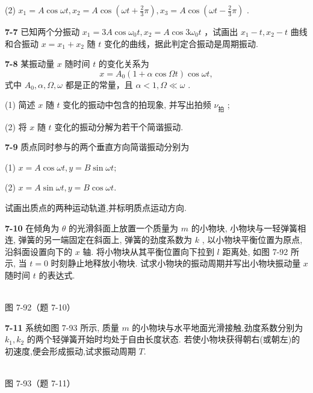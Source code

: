 (2) $x_{1} = A\cos \omega t, x_{2} = A\cos \left(\omega t + \frac{2}{3}\pi\right), x_{3} = A\cos \left(\omega t - \frac{2}{3}\pi\right)$ .

\newpage

\textbf{7-7} 已知两个分振动 $x_{1} = 3A\cos \omega_{0}t, x_{2} = A\cos 3\omega_{0}t$ ，试画出 $x_{1} - t, x_{2} - t$ 曲线和合振动 $x = x_{1} + x_{2}$ 随 $t$ 变化的曲线，据此判定合振动是周期振动.

\newpage

\textbf{7-8} 某振动量 $x$ 随时间 $t$ 的变化关系为
\[
x = A _ {0} (1 + \alpha \cos \Omega t) \cos \omega t,
\]
式中 $A_0, \alpha, \Omega, \omega$ 都是正的常量，且 $\alpha < 1, \Omega \ll \omega$ .

(1) 简述 $x$ 随 $t$ 变化的振动中包含的拍现象, 并写出拍频 $\nu_{\text{拍}}$ ;

(2) 将 $x$ 随 $t$ 变化的振动分解为若干个简谐振动.

\newpage

\textbf{7-9} 质点同时参与的两个垂直方向简谐振动分别为

(1) $x = A\cos \omega t, y = B\sin \omega t;$

(2) $x = A\sin \omega t, y = B\cos \omega t.$

试画出质点的两种运动轨道,并标明质点运动方向.

\newpage

\textbf{7-10} 在倾角为 $\theta$ 的光滑斜面上放置一个质量为 $m$ 的小物块, 小物块与一轻弹簧相连, 弹簧的另一端固定在斜面上, 弹簧的劲度系数为 $k$ , 以小物块平衡位置为原点, 沿斜面设置向下的 $x$ 轴. 将小物块从其平衡位置向下拉到 $l$ 距离处, 如图 7-92 所示, 当 $t=0$ 时刻静止地释放小物块. 试求小物块的振动周期并写出小物块振动量 $x$ 随时间 $t$ 的表达式.

\begin{center}
\resizebox{0.40\textwidth}{!}{}\\[4pt]
{\small 图 7-92（题 7-10）}
\end{center}

\newpage

\textbf{7-11} 系统如图 7-93 所示, 质量 $m$ 的小物块与水平地面光滑接触,劲度系数分别为 $k_{1}, k_{2}$ 的两个轻弹簧开始时均处于自由长度状态. 若使小物块获得朝右(或朝左)的初速度,便会形成振动,试求振动周期 $T$.

\begin{center}
\resizebox{0.45\textwidth}{!}{}\\[4pt]
{\small 图 7-93（题 7-11）}
\end{center}

